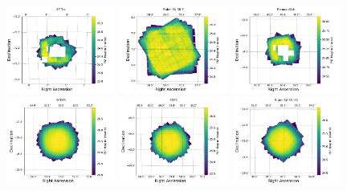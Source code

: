 \begin{figure}
    \begin{center}
        \includegraphics[width=0.32\textwidth]{observations_figures/comcam_psf_maglim_47_tuc_r.pdf}
        \includegraphics[width=0.32\textwidth]{observations_figures/comcam_psf_maglim_rubin_sv_38_7_r.pdf}
        \includegraphics[width=0.32\textwidth]{observations_figures/comcam_psf_maglim_fornax_dsph_r.pdf}
        \includegraphics[width=0.32\textwidth]{observations_figures/comcam_psf_maglim_ecdfs_r.pdf}
        \includegraphics[width=0.32\textwidth]{observations_figures/comcam_psf_maglim_edfs_r.pdf}
        \includegraphics[width=0.32\textwidth]{observations_figures/comcam_psf_maglim_rubin_sv_95_-25_r.pdf}

\end{center}
\end{figure}
